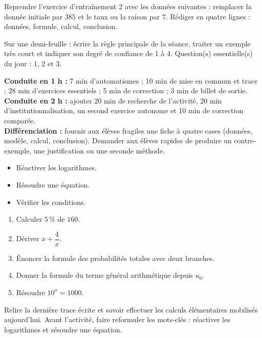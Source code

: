 
\begin{dm}Reprendre l'exercice d'entraînement 2 avec les données suivantes : remplacer la donnée initiale par $385$ et le taux ou la raison par $7$. Rédiger en quatre lignes : données, formule, calcul, conclusion.\end{dm}

\begin{sortie}Sur une demi-feuille : écrire la règle principale de la séance, traiter un exemple très court et indiquer son degré de confiance de 1 à 4. Question(s) essentielle(s) du jour : 1, 2 et 3.\end{sortie}

\ifprof
\begin{methode}
\textbf{Conduite en 1 h :} 7 min d'automatismes ; 10 min de mise en commun et trace ; 28 min d'exercices essentiels ; 5 min de correction ; 3 min de billet de sortie.\\
\textbf{Conduite en 2 h :} ajouter 20 min de recherche de l'activité, 20 min d'institutionnalisation, un second exercice autonome et 10 min de correction comparée.\\
\textbf{Différenciation :} fournir aux élèves fragiles une fiche à quatre cases (données, modèle, calcul, conclusion). Demander aux élèves rapides de produire un contre-exemple, une justification ou une seconde méthode.
\end{methode}
\fi
{}
\begin{objectifs}\begin{itemize}\item Réactiver les logarithmes.\item Résoudre une équation.\item Vérifier les conditions.\end{itemize}\end{objectifs}
\begin{automatismes}\begin{enumerate}\item Calculer $5\,\%$ de $160$. \item Dériver $x+\dfrac4x$. \item Énoncer la formule des probabilités totales avec deux branches. \item Donner la formule du terme général arithmétique depuis $u_0$. \item Résoudre $10^x=1000$. \end{enumerate}\end{automatismes}
\begin{prerequis}Relire la dernière trace écrite et savoir effectuer les calculs élémentaires mobilisés aujourd'hui. Avant l'activité, faire reformuler les mots-clés : réactiver les logarithmes et résoudre une équation.\end{prerequis}

